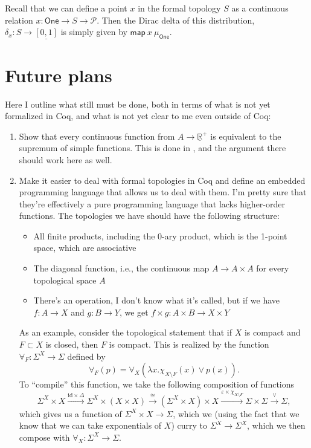 \documentclass{article}           %
\newcommand{\Prop}{\mathcal{P}}
\newcommand{\map}[2]{\mathsf{map}\ {#1}\ {#2}}
\newcommand{\One}{\mathsf{One}}
\begin{document}
Recall that we can define a point $x$ in the formal topology $S$ as a continuous relation $x : \One \to S \to \Prop$. Then the Dirac delta of this distribution, $\delta_x : S \to \underline{[0,1]}$ is simply given by $\map{x}{\mu_\One}$.

\section{Future plans}

Here I outline what still must be done, both in terms of what is not yet formalized in Coq, and what is not yet clear to me even outside of Coq:

\begin{enumerate}
\item Show that every continuous function from $A \to \underline{\mathbb{R}}^+$ is equivalent to the supremum of simple functions. This is done in \cite{jones1990}, and the argument there should work here as well.
\item Make it easier to deal with formal topologies in Coq and define an embedded programming language that allows us to deal with them. I'm pretty sure that they're effectively a pure programming language that lacks higher-order functions. The topologies we have should have the following structure:
  \begin{itemize}
  \item All finite products, including the 0-ary product, which is the 1-point space, which are associative
  \item The diagonal function, i.e., the continuous map $A \to A \times A$ for every topological space $A$
  \item There's an operation, I don't know what it's called, but if we have $f : A \to X$ and $g : B \to Y$, we get $f \times g : A \times B \to X \times Y$
  \end{itemize}
  As an example, consider the topological statement that if $X$ is compact and $F \subset X$ is closed, then $F$ is compact\cite{escardo2004}. This is realized by the function $\forall_F : \Sigma^X \to \Sigma$ defined by
\[
\forall_F(p) = \forall_X(\lambda x. \chi_{X \setminus F}(x) \vee p(x)).
\]
To ``compile'' this function, we take the following composition of functions
\[
\Sigma^X \times X
\xrightarrow{\mathrm{id} \times \Delta}
\Sigma^X \times (X \times X)
\xrightarrow{\cong}
(\Sigma^X \times X) \times X
\xrightarrow{\varepsilon \times \chi_{X \setminus F}}
\Sigma \times \Sigma
\xrightarrow{\vee}
\Sigma,
\]
which gives us a function of $\Sigma^X \times X \to \Sigma$, which we (using the fact that we know that we can take exponentials of $X$) curry to $\Sigma^X \to \Sigma^X$, which we then compose with $\forall_X : \Sigma^X \to \Sigma$.


\end{enumerate}
\end{document}
